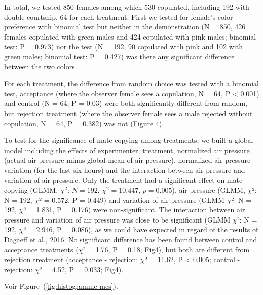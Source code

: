 \documentclass[a4paper, 12pt]{article}
\begin{document}
	In total, we tested 850 females among which 530 copulated, including 192 with double-courtship, 64 for each treatment. First we tested for female's color preference with binomial test but neither in the demonstration (N = 850, 426 females copulated with green males and 424 copulated with pink males; binomial test: P = 0.973) nor the test (N = 192, 90 copulated with pink and 102 with green males; binomial test: P = 0.427) was there any significant difference between the two colors.

	For each treatment, the difference from random choice was tested with a binomial test, acceptance (where the observer female sees a copulation, N = 64, P {\textless} 0.001) and control (N = 64, P = 0.03) were both significantly different from random, but rejection treatment (where the observer female sees a male rejected without copulation, N = 64, P = 0.382) was not (Figure 4).

	To test for the significance of mate copying among treatments, we built a global model including the effects of experimenter, treatment, normalized air pressure (actual air pressure minus global mean of air pressure), normalized air pressure variation (for the last six hours) and the interaction between air pressure and variation of air pressure. Only the treatment had a significant effect on mate-copying (GLMM, $\chi^2$: $N = 192$, $\chi^2 = 10.447$, $p = 0.005$), air pressure (GLMM, $\chi $²: N = 192, $\chi $² = 0.572, P = 0.449) and variation of air pressure (GLMM $\chi $²: N = 192, $\chi $² = 1.831, P = 0.176) were non-significant. The interaction between air pressure and variation of air pressure was close to be significant (GLMM $\chi $²: N = 192, $\chi $² = 2.946, P = 0.086), as we could have expected in regard of the results of Dagaeff et al., 2016. No significant difference has been found between control and acceptance treatments ($\chi $² = 1.76, P = 0.18; Fig4), but both are different from rejection treatment (acceptance - rejection: $\chi $² = 11.62, P {\textless} 0.005; control - rejection: $\chi $² = 4.52, P = 0.033; Fig4).
	
	Voir Figure~(\ref{fig:histogramme-mcs}).




\clearpage
\newrefcontext[sorting=nyt] %
\printbibliography
\end{document}
